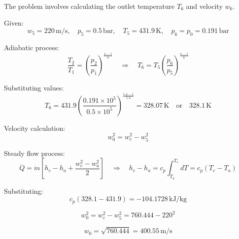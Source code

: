 The problem involves calculating the outlet temperature \( T_6 \) and velocity \( w_6 \).  

Given:  
\[
w_5 = 220 \, \text{m/s}, \quad p_5 = 0.5 \, \text{bar}, \quad T_5 = 431.9 \, \text{K}, \quad p_6 = p_0 = 0.191 \, \text{bar}
\]  

Adiabatic process:  
\[
\frac{T_2}{T_1} = \left( \frac{p_2}{p_1} \right)^{\frac{\kappa-1}{\kappa}} \quad \Rightarrow \quad T_6 = T_5 \left( \frac{p_6}{p_5} \right)^{\frac{\kappa-1}{\kappa}}
\]  

Substituting values:  
\[
T_6 = 431.9 \left( \frac{0.191 \times 10^5}{0.5 \times 10^5} \right)^{\frac{1.4-1}{1.4}} = 328.07 \, \text{K} \quad \text{or} \quad 328.1 \, \text{K}
\]  

Velocity calculation:  
\[
w_0^2 = w_c^2 - w_5^2
\]  

Steady flow process:  
\[
\dot{Q} = \dot{m} \left[ h_c - h_a + \frac{w_c^2 - w_a^2}{2} \right] \quad \Rightarrow \quad h_c - h_a = c_p \int_{T_a}^{T_c} dT = c_p (T_c - T_a)
\]  

Substituting:  
\[
c_p (328.1 - 431.9) = -104.1728 \, \text{kJ/kg}
\]  

\[
w_0^2 = w_c^2 - w_5^2 = 760.444 - 220^2
\]  

\[
w_0 = \sqrt{760.444} = 400.55 \, \text{m/s}
\]